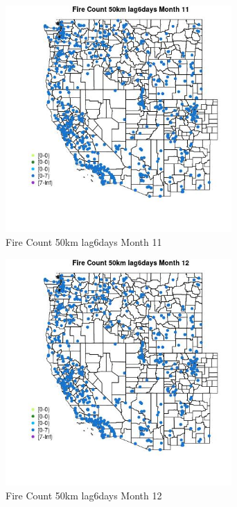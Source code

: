 \begin{figure} 
\centering  
\includegraphics[width=0.77\textwidth]{Code_Outputs/Report_ML_input_PM25_Step4_part_e_de_duplicated_aves_compiled_2019-05-21wNAs_MapObsMo11Fire_Count_50km_lag6days.jpg} 
\caption{\label{fig:Report_ML_input_PM25_Step4_part_e_de_duplicated_aves_compiled_2019-05-21wNAsMapObsMo11Fire_Count_50km_lag6days}Fire Count 50km lag6days Month 11} 
\end{figure} 
 

\begin{figure} 
\centering  
\includegraphics[width=0.77\textwidth]{Code_Outputs/Report_ML_input_PM25_Step4_part_e_de_duplicated_aves_compiled_2019-05-21wNAs_MapObsMo12Fire_Count_50km_lag6days.jpg} 
\caption{\label{fig:Report_ML_input_PM25_Step4_part_e_de_duplicated_aves_compiled_2019-05-21wNAsMapObsMo12Fire_Count_50km_lag6days}Fire Count 50km lag6days Month 12} 
\end{figure} 
 

